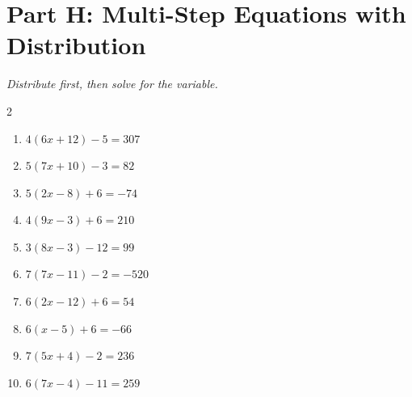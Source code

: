 \documentclass[11pt]{article}
\begin{document}
\section*{Part H: Multi-Step Equations with Distribution}
\noindent\textit{Distribute first, then solve for the variable.}
\begin{multicols}{2}
\begin{enumerate}
  \item $4(6x + 12) - 5 = 307$
  \vspace{1.8cm}
  \item $5(7x + 10) - 3 = 82$
  \vspace{1.8cm}
  \item $5(2x - 8) + 6 = -74$
  \vspace{1.8cm}
  \item $4(9x - 3) + 6 = 210$
  \vspace{1.8cm}
  \item $3(8x - 3) - 12 = 99$
  \vspace{1.8cm}
  \item $7(7x - 11) - 2 = -520$
  \vspace{1.8cm}
  \item $6(2x - 12) + 6 = 54$
  \vspace{1.8cm}
  \item $6(x - 5) + 6 = -66$
  \vspace{1.8cm}
  \item $7(5x + 4) - 2 = 236$
  \vspace{1.8cm}
  \item $6(7x - 4) - 11 = 259$
  \vspace{1.8cm}
\end{enumerate}
\end{multicols}
\end{document}
